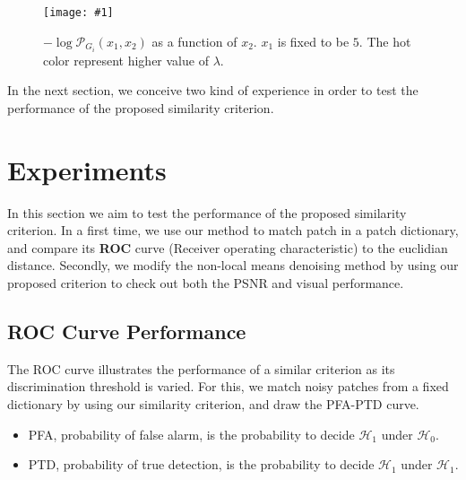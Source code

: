 \documentclass[runningheads]{llncs}
\newcommand{\insertF}[4]{
  \begin{figure}[h!]
    \centering
    \begin{minipage}{#3\linewidth}
    \texttt{[image: \#1]}
    \end{minipage}  
      \caption{#2}
      \label{#4}
  \end{figure}  
}
\begin{document}
\insertF{simL1}{$-\log \mathcal{P}_{G_i} (x_1, x_2)$ as a function of $x_2$. $x_1$ is fixed to be $5$. The hot color represent higher value of $\lambda$.}{0.8}{llr1lam}

In the next section, we conceive two kind of experience in order to test the performance of the proposed similarity criterion.

\section{Experiments}
In this section we aim to test the performance of the proposed similarity criterion. In a first time, we use our method to match patch in a patch dictionary, and compare its \textbf{ROC} curve (Receiver operating characteristic) to the euclidian distance. Secondly, we modify the non-local means denoising method by using our proposed criterion to check out both the PSNR and visual performance.
\subsection{ROC Curve Performance}
The ROC curve illustrates the performance of a similar criterion as its discrimination threshold is varied. For this, we match noisy patches from a fixed dictionary by using our similarity criterion, and draw the PFA-PTD curve. 
\begin{itemize}
 \item PFA, probability of false alarm, is the probability to decide $\mathcal{H}_1$ under $\mathcal{H}_0$.
 \item PTD, probability of true detection, is the probability to decide $\mathcal{H}_1$ under $\mathcal{H}_1$.
\end{itemize}
\end{document}

